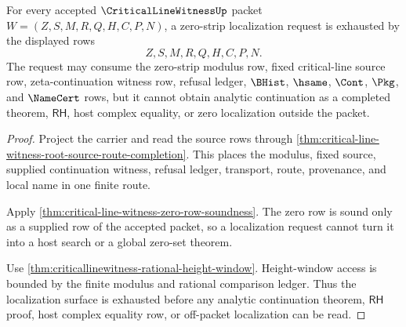 \begin{theorem}
\label{thm:critical-line-witness-zero-strip-localization-exhaustion}
For every accepted $\CriticalLineWitnessUp$ packet $W=(Z,S,M,R,Q,H,C,P,N)$, a zero-strip localization request is exhausted by the displayed rows
$$
Z,S,M,R,Q,H,C,P,N.
$$
The request may consume the zero-strip modulus row, fixed critical-line source row, zeta-continuation witness row, refusal ledger, $\BHist$, $\hsame$, $\Cont$, $\Pkg$, and $\NameCert$ rows, but it cannot obtain analytic continuation as a completed theorem, $\mathsf{RH}$, host complex equality, or zero localization outside the packet.
\end{theorem}
\begin{proof}
Project the carrier and read the source rows through \autoref{thm:critical-line-witness-root-source-route-completion}. This places the modulus, fixed source, supplied continuation witness, refusal ledger, transport, route, provenance, and local name in one finite route.

Apply \autoref{thm:critical-line-witness-zero-row-soundness}. The zero row is sound only as a supplied row of the accepted packet, so a localization request cannot turn it into a host search or a global zero-set theorem.

Use \autoref{thm:criticallinewitness-rational-height-window}. Height-window access is bounded by the finite modulus and rational comparison ledger. Thus the localization surface is exhausted before any analytic continuation theorem, $\mathsf{RH}$ proof, host complex equality row, or off-packet localization can be read.
\end{proof}

